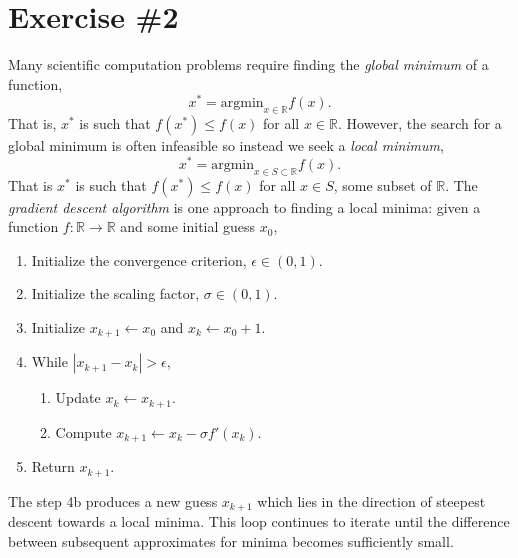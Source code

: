 \documentclass[12pt]{article}
\begin{document}
\section*{Exercise \#2}


Many scientific computation problems require finding the {\it global minimum} of
a function,
\[
  x^* = \text{argmin}_{x \in \mathbb{R}} f(x).
\]
That is, $x^*$ is such that $f(x^*) \leq f(x)$ for all $x \in \mathbb{R}$.
However, the search for a global minimum is often infeasible so instead we seek
a {\it local minimum},
\[
  x^* = \text{argmin}_{x \in S \subset \mathbb{R}} f(x).
\]
That is $x^*$ is such that $f(x^*) \leq f(x)$ for all $x \in S$, some subset of
$\mathbb{R}$. The {\it gradient descent algorithm} is one approach to finding a
local minima: given a function $f : \mathbb{R} \to \mathbb{R}$ and some initial
guess $x_0$,
\begin{enumerate}
\item Initialize the convergence criterion, $\epsilon \in (0,1)$.
\item Initialize the scaling factor, $\sigma \in (0,1)$.
\item Initialize $x_{k+1} \gets x_0$ and $x_k \gets x_0 + 1$.
\item While $|x_{k+1} - x_k| > \epsilon$,
\begin{enumerate}
\item Update $x_k \gets x_{k+1}$.
\item Compute $x_{k+1} \gets x_k - \sigma f'(x_k)$.
\end{enumerate}
\item Return $x_{k+1}$.
\end{enumerate}
The step 4b produces a new guess $x_{k+1}$ which lies in the direction of
steepest descent towards a local minima. This loop continues to iterate until
the difference between subsequent approximates for minima becomes sufficiently
small.
\end{document}
